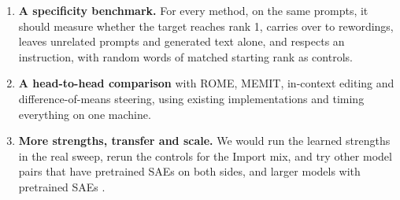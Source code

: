 \begin{enumerate}
  \item \textbf{A specificity benchmark.} For every method, on the same prompts, it should measure whether the target reaches rank 1, carries over to rewordings, leaves unrelated prompts and generated text alone, and respects an instruction, with random words of matched starting rank as controls.
  \item \textbf{A head-to-head comparison} with ROME, MEMIT, in-context editing and difference-of-means steering, using existing implementations \cite{r32} and timing everything on one machine.
  \item \textbf{More strengths, transfer and scale.} We would run the learned strengths in the real sweep, rerun the controls for the Import mix, and try other model pairs that have pretrained SAEs on both sides, and larger models with pretrained SAEs \cite{r19}.
\end{enumerate}
